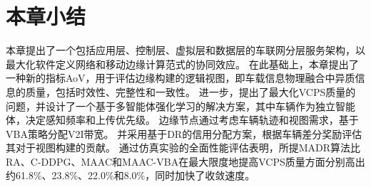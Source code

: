 \section{本章小结}\label{section 2-7}

本章提出了一个包括应用层、控制层、虚拟层和数据层的车联网分层服务架构，以最大化软件定义网络和移动边缘计算范式的协同效应。
在此基础上，本章提出了一种新的指标AoV，用于评估边缘构建的逻辑视图，即车载信息物理融合中异质信息的质量，包括时效性、完整性和一致性。
进一步，提出了最大化VCPS质量的问题，并设计了一个基于多智能体强化学习的解决方案，其中车辆作为独立智能体，决定感知频率和上传优先级。
边缘节点通过考虑车辆轨迹和视图需求，基于VBA策略分配V2I带宽。
并采用基于DR的信用分配方案，根据车辆差分奖励评估其对于视图构建的贡献。
通过仿真实验的全面性能评估表明，所提MADR算法比RA、C-DDPG、MAAC和MAAC-VBA在最大限度地提高VCPS质量方面分别高出约61.8\%、23.8\%、22.0\%和8.0\%，同时加快了收敛速度。